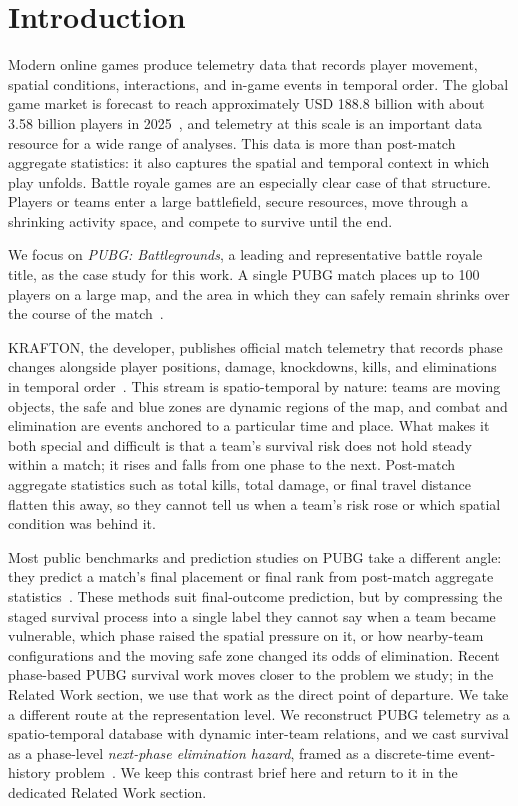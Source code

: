 \section{Introduction}

Modern online games produce telemetry data that records player movement, spatial conditions, interactions, and in-game events in temporal order. The global game market is forecast to reach approximately USD 188.8 billion with about 3.58 billion players in 2025~\cite{newzoo2025globalgames}, and telemetry at this scale is an important data resource for a wide range of analyses. This data is more than post-match aggregate statistics: it also captures the spatial and temporal context in which play unfolds. Battle royale games are an especially clear case of that structure. Players or teams enter a large battlefield, secure resources, move through a shrinking activity space, and compete to survive until the end.

We focus on \textit{PUBG: Battlegrounds}, a leading and representative battle royale title, as the case study for this work. A single PUBG match places up to 100 players on a large map, and the area in which they can safely remain shrinks over the course of the match~\cite{pubgGameInfo}.

KRAFTON, the developer, publishes official match telemetry that records phase changes alongside player positions, damage, knockdowns, kills, and eliminations in temporal order~\cite{pubgTelemetryEvents}. This stream is spatio-temporal by nature: teams are moving objects, the safe and blue zones are dynamic regions of the map, and combat and elimination are events anchored to a particular time and place. What makes it both special and difficult is that a team's survival risk does not hold steady within a match; it rises and falls from one phase to the next. Post-match aggregate statistics such as total kills, total damage, or final travel distance flatten this away, so they cannot tell us when a team's risk rose or which spatial condition was behind it.

Most public benchmarks and prediction studies on PUBG take a different angle: they predict a match's final placement or final rank from post-match aggregate statistics~\cite{kagglePubgFinishPlacement,sen2021pubgFinalRank,lee2025pubgRank}. These methods suit final-outcome prediction, but by compressing the staged survival process into a single label they cannot say when a team became vulnerable, which phase raised the spatial pressure on it, or how nearby-team configurations and the moving safe zone changed its odds of elimination. Recent phase-based PUBG survival work moves closer to the problem we study; in the Related Work section, we use that work as the direct point of departure. We take a different route at the representation level. We reconstruct PUBG telemetry as a spatio-temporal database with dynamic inter-team relations, and we cast survival as a phase-level \textit{next-phase elimination hazard}, framed as a discrete-time event-history problem~\cite{allison1982discrete,singer1993discrete}. We keep this contrast brief here and return to it in the dedicated Related Work section.


